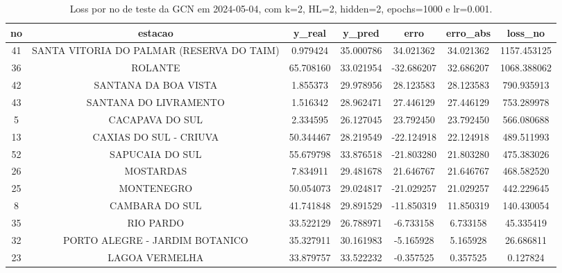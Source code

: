 \begin{table}[h]
\centering
\caption{Loss por no de teste da GCN em 2024-05-04, com k=2, HL=2, hidden=2, epochs=1000 e lr=0.001.}
\label{tab:gcn_loss_k2_hl2_h2_e1000_d20240504}
\begin{tabular}{ccccccc}
\toprule
no & estacao & y\_real & y\_pred & erro & erro\_abs & loss\_no \\
\midrule
41 & SANTA VITORIA DO PALMAR (RESERVA DO TAIM) & 0.979424 & 35.000786 & 34.021362 & 34.021362 & 1157.453125 \\
36 & ROLANTE & 65.708160 & 33.021954 & -32.686207 & 32.686207 & 1068.388062 \\
42 & SANTANA DA BOA VISTA & 1.855373 & 29.978956 & 28.123583 & 28.123583 & 790.935913 \\
43 & SANTANA DO LIVRAMENTO & 1.516342 & 28.962471 & 27.446129 & 27.446129 & 753.289978 \\
5 & CACAPAVA DO SUL & 2.334595 & 26.127045 & 23.792450 & 23.792450 & 566.080688 \\
13 & CAXIAS DO SUL - CRIUVA & 50.344467 & 28.219549 & -22.124918 & 22.124918 & 489.511993 \\
52 & SAPUCAIA DO SUL & 55.679798 & 33.876518 & -21.803280 & 21.803280 & 475.383026 \\
26 & MOSTARDAS & 7.834911 & 29.481678 & 21.646767 & 21.646767 & 468.582520 \\
25 & MONTENEGRO & 50.054073 & 29.024817 & -21.029257 & 21.029257 & 442.229645 \\
8 & CAMBARA DO SUL & 41.741848 & 29.891529 & -11.850319 & 11.850319 & 140.430054 \\
35 & RIO PARDO & 33.522129 & 26.788971 & -6.733158 & 6.733158 & 45.335419 \\
32 & PORTO ALEGRE - JARDIM BOTANICO & 35.327911 & 30.161983 & -5.165928 & 5.165928 & 26.686811 \\
23 & LAGOA VERMELHA & 33.879757 & 33.522232 & -0.357525 & 0.357525 & 0.127824 \\
\bottomrule
\end{tabular}
\end{table}
